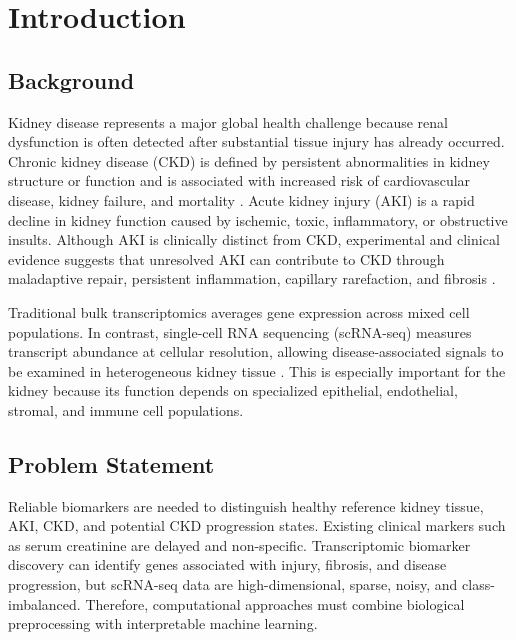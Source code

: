\chapter{Introduction}
\section{Background}
Kidney disease represents a major global health challenge because renal dysfunction is often detected after substantial tissue injury has already occurred. Chronic kidney disease (CKD) is defined by persistent abnormalities in kidney structure or function and is associated with increased risk of cardiovascular disease, kidney failure, and mortality \cite{kdigo2024ckd}. Acute kidney injury (AKI) is a rapid decline in kidney function caused by ischemic, toxic, inflammatory, or obstructive insults. Although AKI is clinically distinct from CKD, experimental and clinical evidence suggests that unresolved AKI can contribute to CKD through maladaptive repair, persistent inflammation, capillary rarefaction, and fibrosis \cite{chawla2014aki_ckd}.

Traditional bulk transcriptomics averages gene expression across mixed cell populations. In contrast, single-cell RNA sequencing (scRNA-seq) measures transcript abundance at cellular resolution, allowing disease-associated signals to be examined in heterogeneous kidney tissue \cite{liao2020singlecell}. This is especially important for the kidney because its function depends on specialized epithelial, endothelial, stromal, and immune cell populations.

\section{Problem Statement}
Reliable biomarkers are needed to distinguish healthy reference kidney tissue, AKI, CKD, and potential CKD progression states. Existing clinical markers such as serum creatinine are delayed and non-specific. Transcriptomic biomarker discovery can identify genes associated with injury, fibrosis, and disease progression, but scRNA-seq data are high-dimensional, sparse, noisy, and class-imbalanced. Therefore, computational approaches must combine biological preprocessing with interpretable machine learning.

